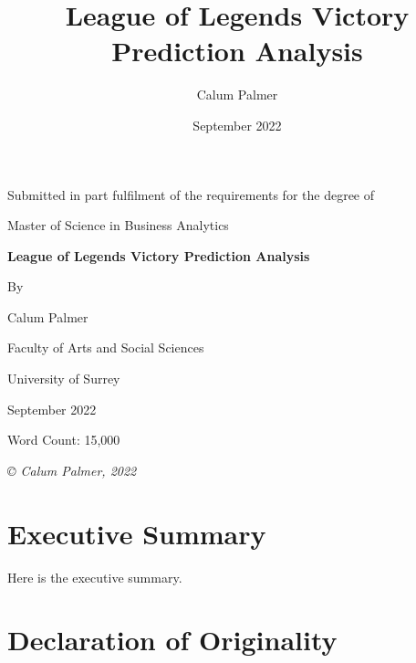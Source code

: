 \documentclass[12pt,a4 paper]{report}
\title{League of Legends Victory Prediction Analysis}
\author{Calum Palmer}
\date{September 2022}
\begin{document}
    \begin{titlepage}
    \centering
        {\large Submitted in part fulfilment of the requirements for the degree of}


        {\Large Master of Science in Business Analytics}

    \vspace{2cm}
        {\huge\bfseries League of Legends Victory Prediction Analysis}

    \vspace{1.5cm}
        {By}

    \vspace{0.5cm}
        {\Large Calum Palmer}

    \vspace{5cm}
        {\large Faculty of Arts and Social Sciences}

    \vspace{0.25cm}
        {\large University of Surrey}

    \vspace{1cm}
        {\large September 2022}

    \vspace{1.5cm}
        {\large Word Count: 15,000}

    \vfill
        {\itshape © Calum Palmer, 2022}

    \end{titlepage}

    \setcounter{page}{2}

    \section*{Executive Summary}\label{sec:executive summary}
    Here is the executive summary.

    \newpage
    \section*{Declaration of Originality}\label{sec:declaration of originality}
\end{document}
